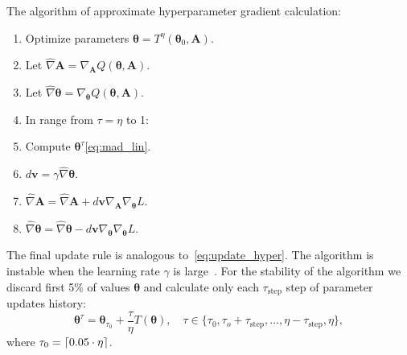 \documentclass[smallextended]{svjour3}
\DeclarePairedDelimiter\ceil{\lceil}{\rceil}
\begin{document}
The algorithm of approximate hyperparameter gradient calculation:
\begin{enumerate}
\item Optimize  parameters $\boldsymbol{\theta} = T^\eta(\boldsymbol{\theta}_0, \mathbf{A})$.
\item Let $\hat{\nabla} \mathbf{A} = \nabla_\mathbf{A} Q(\boldsymbol{\theta}, \mathbf{A}).$ 
\item Let $\hat{\nabla} \boldsymbol{\theta} = \nabla_{\boldsymbol{\theta}} Q(\boldsymbol{\theta}, \mathbf{A}).$ 
\item In range from $\tau = \eta$ to  1:
\item Compute $\boldsymbol{\theta}^\tau$\eqref{eq:mad_lin}.
\item $d\mathbf{v} =  \gamma \hat{\nabla} {\boldsymbol{\theta}}$.
\item $\hat{\nabla} \mathbf{A} =  \hat{\nabla} \mathbf{A} + d\mathbf{v}\nabla_{\mathbf{A}} \nabla_{\boldsymbol{\theta}} L$.
\item $\hat{\nabla} \boldsymbol{\theta}  = \hat{\nabla} \boldsymbol{\theta}  - d\mathbf{v}\nabla_{\boldsymbol{\theta}} \nabla_{\boldsymbol{\theta}} L$.
\end{enumerate}
The final update rule is analogous to~\eqref{eq:update_hyper}.
The algorithm is instable when the learning rate $\gamma$ is large~\cite{hyper_mad}. For the stability of the algorithm we discard first 5\% of values  $\boldsymbol{\theta}$ and calculate only each $\tau_\text{step}$ step of parameter updates history:
\begin{equation}
\label{eq:mad_lin2}
\boldsymbol{\theta}^\tau = \boldsymbol{\theta}_{\tau_0} + \frac{\tau}{\eta} T(\boldsymbol{\theta}), \quad \tau \in \{\tau_0, \tau_o + \tau_\text{step}, \dots,\eta - \tau_\text{step}, \eta\},
\end{equation}
where $\tau_0 = \ceil{0.05 \cdot \eta}$.
\end{document}
